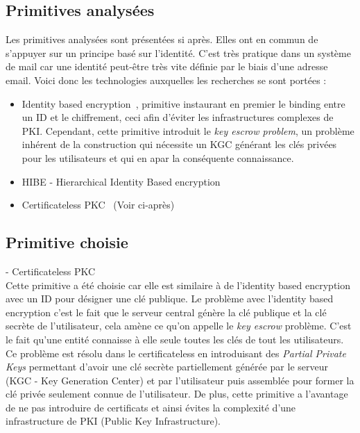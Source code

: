 \subsection{Primitives analysées}
Les primitives analysées sont présentées si après. Elles ont en commun de s'appuyer sur un principe basé sur l'identité. C'est très pratique dans un système de mail car une identité peut-être très vite définie par le biais d'une adresse email. Voici donc les technologies auxquelles les recherches se sont portées :
\begin{itemize}
	\item Identity based encryption~\cite{DBLP:conf/crypto/Shamir84}, primitive instaurant en premier le binding entre un ID et le chiffrement, ceci afin d'éviter les infrastructures complexes de PKI. Cependant, cette primitive introduit le \textit{key escrow problem}, un problème inhérent de la construction qui nécessite un KGC générant les clés privées pour les utilisateurs et qui en apar la conséquente connaissance.
	\item HIBE - Hierarchical Identity Based encryption~\cite{DBLP:conf/eurocrypt/HorwitzL02}
	\item Certificateless PKC~\cite{DBLP:conf/asiacrypt/Al-RiyamiP03} (Voir ci-après)
\end{itemize}
\subsection{Primitive choisie}
- Certificateless PKC~\cite{DBLP:conf/asiacrypt/Al-RiyamiP03}\\
 Cette primitive a été choisie car elle est similaire à de l'identity based encryption avec un ID pour désigner une clé publique. Le problème avec l'identity based encryption c'est le fait que le serveur central génère la clé publique et la clé secrète de l'utilisateur, cela amène ce qu'on appelle le \textit{key escrow} problème. C'est le fait qu'une entité connaisse à elle seule toutes les clés de tout les utilisateurs. Ce problème est résolu dans le certificateless en introduisant des \textit{Partial Private Keys} permettant d'avoir une clé secrète partiellement générée par le serveur (KGC - Key Generation Center) et par l'utilisateur puis assemblée pour former la clé privée seulement connue de l'utilisateur. De plus, cette primitive a l'avantage de ne pas introduire de certificats et ainsi évites la complexité d'une infrastructure de PKI (Public Key Infrastructure).
